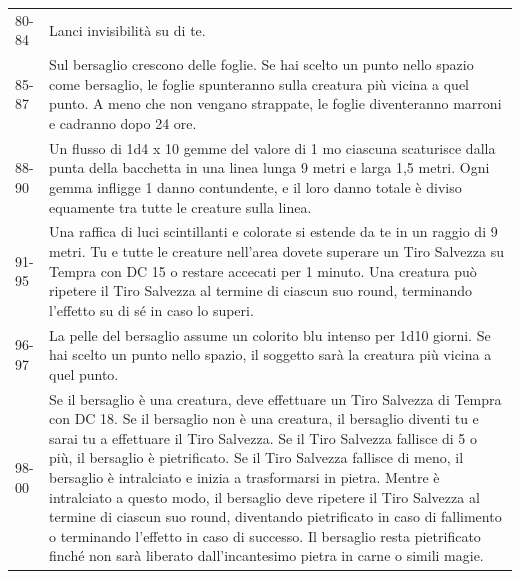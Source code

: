 \begin{tabularx}{0.95\textwidth}{lX}
	80-84 &Lanci invisibilità su di te.\\
	85-87 &Sul bersaglio crescono delle foglie. Se hai scelto un punto nello spazio come bersaglio, le foglie spunteranno sulla creatura più vicina a quel punto. A meno che non vengano strappate, le foglie diventeranno marroni e cadranno dopo 24 ore.\\
	88-90& Un flusso di 1d4 x 10 gemme del valore di 1 mo ciascuna scaturisce dalla punta della bacchetta in una linea lunga 9 metri e larga 1,5 metri. Ogni gemma infligge 1 danno contundente, e il loro danno totale è diviso equamente tra tutte le creature sulla linea.\\
	91-95 &Una raffica di luci scintillanti e colorate si estende da te in un raggio di 9 metri. Tu e tutte le creature nell'area dovete superare un Tiro Salvezza su Tempra con DC 15 o restare accecati per 1 minuto. Una creatura può ripetere il Tiro Salvezza al termine di ciascun suo round, terminando l'effetto su di sé in caso lo superi.\\
	96-97 &La pelle del bersaglio assume un colorito blu intenso per 1d10 giorni. Se hai scelto un punto nello spazio, il soggetto sarà la creatura più vicina a quel punto.\\
	98-00 &Se il bersaglio è una creatura, deve effettuare un Tiro Salvezza di Tempra con DC 18. Se il bersaglio non è una creatura, il bersaglio diventi tu e sarai tu a effettuare il Tiro Salvezza. Se il Tiro Salvezza fallisce di 5 o più, il bersaglio è pietrificato. Se il Tiro Salvezza fallisce di meno, il bersaglio è intralciato e inizia a trasformarsi in pietra. Mentre è intralciato a questo modo, il bersaglio deve ripetere il Tiro Salvezza al termine di ciascun suo round, diventando pietrificato in caso di fallimento o terminando l'effetto in caso di successo. Il bersaglio resta pietrificato finché non sarà liberato dall'incantesimo pietra in carne o simili magie.\\
\end{tabularx}

\medskip


